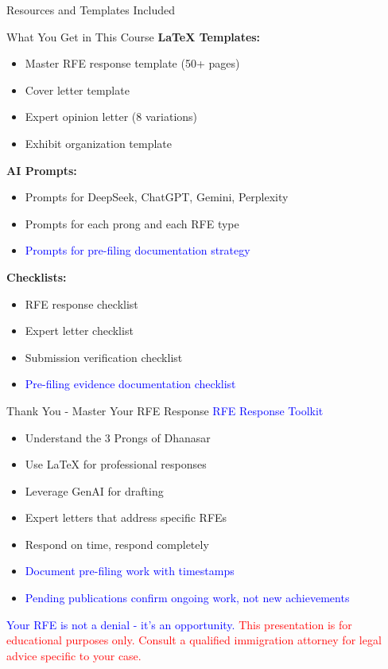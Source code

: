 \documentclass[11pt]{beamer}
\begin{document}
	\begin{frame}{Resources and Templates Included}
		\scriptsize
		\begin{block}{What You Get in This Course}
			\textbf{LaTeX Templates:}
			\begin{itemize}
				\item Master RFE response template (50+ pages)
				\item Cover letter template
				\item Expert opinion letter (8 variations)
				\item Exhibit organization template
			\end{itemize}
			\textbf{AI Prompts:}
			\begin{itemize}
				\item Prompts for DeepSeek, ChatGPT, Gemini, Perplexity
				\item Prompts for each prong and each RFE type
				\item \textcolor{blue}{Prompts for pre-filing documentation strategy}
			\end{itemize}
			\textbf{Checklists:}
			\begin{itemize}
				\item RFE response checklist
				\item Expert letter checklist
				\item Submission verification checklist
				\item \textcolor{blue}{Pre-filing evidence documentation checklist}
			\end{itemize}
		\end{block}
	\end{frame}
	
	\begin{frame}{Thank You - Master Your RFE Response}
		\centering
		\vspace{1cm}
		\textcolor{blue}{\Large RFE Response Toolkit}
		\vspace{0.5cm}
		\begin{itemize}
			\item Understand the 3 Prongs of Dhanasar
			\item Use LaTeX for professional responses
			\item Leverage GenAI for drafting
			\item Expert letters that address specific RFEs
			\item Respond on time, respond completely
			\item \textcolor{blue}{Document pre-filing work with timestamps}
			\item \textcolor{blue}{Pending publications confirm ongoing work, not new achievements}
		\end{itemize}
		\vspace{0.5cm}
		\textcolor{blue}{\Large Your RFE is not a denial - it's an opportunity.}
		\vspace{0.5cm}
		\textcolor{red}{This presentation is for educational purposes only. Consult a qualified immigration attorney for legal advice specific to your case.}
	\end{frame}
	
\end{document}
